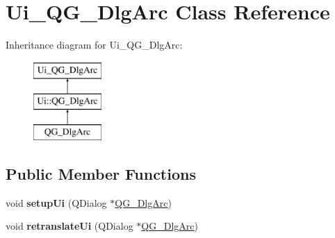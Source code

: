 \hypertarget{classUi__QG__DlgArc}{\section{Ui\-\_\-\-Q\-G\-\_\-\-Dlg\-Arc Class Reference}
\label{classUi__QG__DlgArc}
}
Inheritance diagram for Ui\-\_\-\-Q\-G\-\_\-\-Dlg\-Arc\-:\begin{figure}[H]
\begin{center}
\leavevmode
\includegraphics[height=3.000000cm]{classUi__QG__DlgArc}
\end{center}
\end{figure}
\subsection*{Public Member Functions}
\begin{DoxyCompactItemize}
\item 
\hypertarget{classUi__QG__DlgArc_a5ffb45fac41033b105f8820f0d34a812}{void {\bfseries setup\-Ui} (Q\-Dialog $\ast$\hyperlink{classQG__DlgArc}{Q\-G\-\_\-\-Dlg\-Arc})}\label{classUi__QG__DlgArc_a5ffb45fac41033b105f8820f0d34a812}

\item 
\hypertarget{classUi__QG__DlgArc_a115128032c7fe827b29f85c8dcaf46fe}{void {\bfseries retranslate\-Ui} (Q\-Dialog $\ast$\hyperlink{classQG__DlgArc}{Q\-G\-\_\-\-Dlg\-Arc})}\label{classUi__QG__DlgArc_a115128032c7fe827b29f85c8dcaf46fe}

\end{DoxyCompactItemize}
